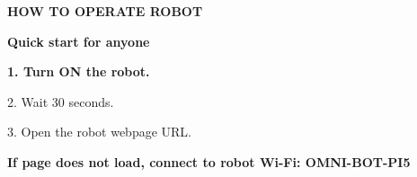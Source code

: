 \documentclass[a4paper,12pt]{article}
\begin{document}
\begin{center}
{\fontsize{46}{50}\selectfont\bfseries HOW TO OPERATE ROBOT}\par
\vspace{4mm}
{\Large\bfseries Quick start for anyone}\par
\vspace{8mm}
\end{center}

{\fontsize{26}{30}\selectfont\bfseries
1. Turn ON the robot.\par
\vspace{5mm}
2. Wait 30 seconds.\par
\vspace{5mm}
3. Open the robot webpage URL.\par
}

\vspace{10mm}

\vfill
\begin{center}
{\large\color{muted}\bfseries If page does not load, connect to robot Wi-Fi: OMNI-BOT-PI5}
\end{center}
\end{document}
